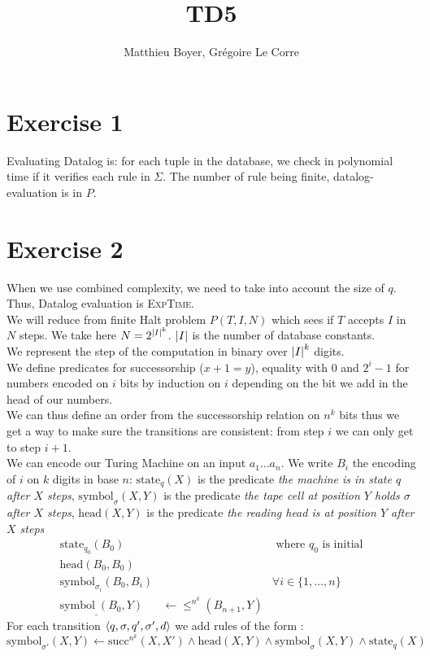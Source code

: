 \documentclass{cours}
\title{TD5}
\author{Matthieu {\sc Boyer}, Grégoire \sc Le Corre}
\begin{document}
\section{Exercise 1}
Evaluating Datalog is: for each tuple in the database, we check in polynomial time if it verifies each rule in $\Sigma$. The number of rule being finite, datalog-evaluation is in $P$. 

\section{Exercise 2}
When we use combined complexity, we need to take into account the size of $q$. Thus, Datalog evaluation is \textsc{ExpTime}.\\
We will reduce from finite Halt problem $P(T, I, N)$ which sees if $T$ accepts $I$ in $N$ steps. We take here $N = 2^{\left|I\right|^{k}}$. $\left|I\right|$ is the number of database constants.\\
We represent the step of the computation in binary over $\left|I\right|^{k}$ digits.\\
We define predicates for successorship ($x+1 = y$), equality with $0$ and $2^{i}-1$ for numbers encoded on $i$ bits by induction on $i$ depending on the bit we add in the head of our numbers.\\
We can thus define an order from the successorship relation on $n^{k}$ bits thus we get a way to make sure the transitions are consistent: from step $i$ we can only get to step $i + 1$.\\
We can encode our Turing Machine on an input $a_{1}\ldots a_{n}$. We write $B_{i}$ the encoding of $i$ on $k$ digits in base $n$: 
$\mathrm{state}_{q}(X)$ is the predicate \textit{the machine is in state $q$ after $X$ steps}, $\mathrm{symbol}_{\sigma}(X, Y)$ is the predicate \textit{the tape cell at position $Y$ holds $\sigma$ after $X$ steps}, $\mathrm{head}(X, Y)$ is the predicate \textit{the reading head is at position $Y$ after $X$ steps}
\[
	\begin{aligned}
		\mathrm{state}_{q_{0}}(B_{0})& & \text{ where } q_{0} \text{ is initial}\\
		\mathrm{head}(B_{0}, B_{0}) & &\\
		\mathrm{symbol}_{\sigma_{i}}(B_{0}, B_{i}) & & \forall i \in \{1, \ldots, n\}\\
		\mathrm{symbol}_{\_}(B_{0}, Y) & \gets \leq^{n^{k}}(B_{n + 1}, Y)&
	\end{aligned}
\]
For each transition $\left\langle q, \sigma, q', \sigma', d \right\rangle$ we add rules of the form : 
\[
	\mathrm{symbol}_{\sigma'}(X, Y) \gets \mathrm{succ}^{n^{k}}(X, X') \land \mathrm{head}(X, Y) \land \mathrm{symbol}_{\sigma}(X, Y)\land \mathrm{state}_{q}(X)
\]
\end{document}
